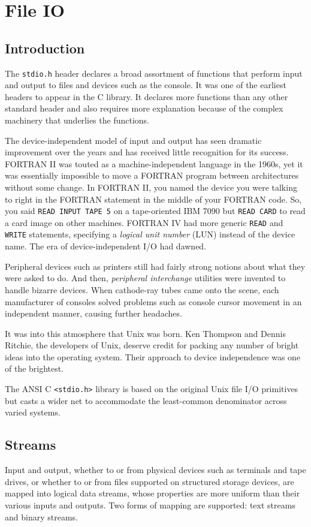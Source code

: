 \section{File IO}
\subsection{Introduction}
The \texttt{stdio.h} header declares a broad assortment of functions that
perform input and output to files and devices such as the console. It was one
of the earliest headers to appear in the C library. It declares more functions
than any other standard header and also requires more explanation because of
the complex machinery that underlies the functions.

The device-independent model of input and output has seen dramatic improvement
over the years and has received little recognition for its success. FORTRAN II
was touted as a machine-independent language in the 1960s, yet it was
essentially impossible to move a FORTRAN program between architectures without
some change. In FORTRAN II, you named the device you were talking to right in
the FORTRAN statement in the middle of your FORTRAN code. So, you said
\texttt{READ INPUT TAPE 5} on a tape-oriented IBM 7090 but \texttt{READ CARD}
to read a card image on other machines. FORTRAN IV had more generic
\texttt{READ} and \texttt{WRITE} statements, specifying a \emph{logical unit
number} (LUN) instead of the device name. The era of device-independent I/O had
dawned.

Peripheral devices such as printers still had fairly strong notions about what
they were asked to do. And then, \emph{peripheral interchange} utilities were
invented to handle bizarre devices. When cathode-ray tubes came onto the scene,
each manufacturer of consoles solved problems such as console cursor movement
in an independent manner, causing further headaches.

It was into this atmosphere that Unix was born. Ken Thompson and Dennis
Ritchie, the developers of Unix, deserve credit for packing any number of
bright ideas into the operating system. Their approach to device independence
was one of the brightest.

The ANSI C \texttt{\textless{}stdio.h\textgreater{}} library is based on the
original Unix file I/O primitives but casts a wider net to accommodate the
least-common denominator across varied systems.

\subsection{Streams}
Input and output, whether to or from physical devices such as terminals and
tape drives, or whether to or from files supported on structured storage
devices, are mapped into logical data streams, whose properties are more
uniform than their various inputs and outputs. Two forms of mapping are
supported: text streams and binary streams.

